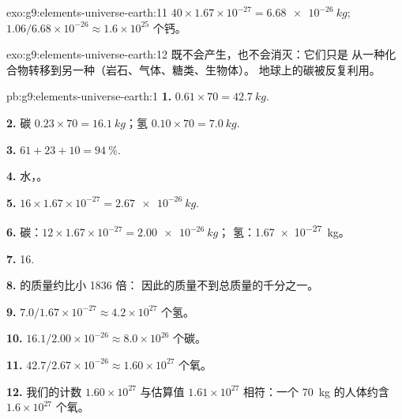 \begin{solution}{exo:g9:elements-universe-earth:11}
$40 \times 1.67 \times 10^{-27} = \qty{6.68e-26}{kg}$;
$1.06 / 6.68 \times 10^{-26} \approx 1.6 \times 10^{25}$ 个钙。
\end{solution}

\begin{solution}{exo:g9:elements-universe-earth:12}
既不会产生，也不会消灭：它们只是
从一种化合物转移到另一种（岩石、气体、糖类、生物体）。
地球上的碳被反复利用。
\end{solution}

\begin{solution}{pb:g9:elements-universe-earth:1}
\textbf{1.} $0.61 \times 70 = \qty{42.7}{kg}$.

\textbf{2.} 碳 $0.23 \times 70 = \qty{16.1}{kg}$；氢
$0.10 \times 70 = \qty{7.0}{kg}$.

\textbf{3.} $61 + 23 + 10 = \qty{94}{\percent}$.

\textbf{4.} 水，。

\textbf{5.} $16 \times 1.67 \times 10^{-27} = \qty{2.67e-26}{kg}$.

\textbf{6.} 碳：$12 \times 1.67 \times 10^{-27} = \qty{2.00e-26}{kg}$；
氢：\qty{1.67e-27}{kg}。

\textbf{7.} 16.

\textbf{8.} 的质量约比小 1836 倍：
因此的质量不到总质量的千分之一。

\textbf{9.} $7.0 / 1.67 \times 10^{-27} \approx 4.2 \times 10^{27}$
个氢。

\textbf{10.} $16.1 / 2.00 \times 10^{-26} \approx 8.0 \times 10^{26}$
个碳。

\textbf{11.} $42.7 / 2.67 \times 10^{-26} \approx 1.60 \times 10^{27}$
个氧。

\textbf{12.} 我们的计数 $1.60 \times 10^{27}$ 与估算值
$1.61 \times 10^{27}$ 相符：一个 \qty{70}{kg} 的人体约含 $1.6 \times
10^{27}$ 个氧。
\end{solution}
